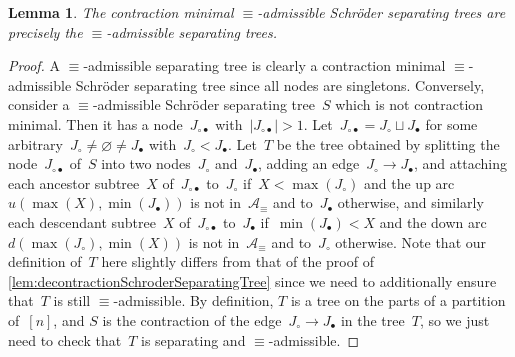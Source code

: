 \documentclass{amsart}
\newtheorem{lemma}[theorem]{Lemma}
\theoremstyle{definition}
\newcommand{\arcs}{{\mathcal{A}}} %
\begin{document}
\begin{lemma}
\label{lem:decontractionAdmissibleSchroderSeparatingTree}
The contraction minimal $\equiv$-admissible Schröder separating trees are precisely the $\equiv$-admissible separating trees.
\end{lemma}

\begin{proof}
A $\equiv$-admissible separating tree is clearly a contraction minimal $\equiv$-admissible Schröder separating tree since all nodes are singletons.
Conversely, consider a $\equiv$-admissible Schröder separating tree~$S$ which is not contraction minimal.
Then it has a node~$J_{\circ\bullet}$ with~$|J_{\circ\bullet}| > 1$.
Let~$J_{\circ\bullet} = J_\circ \sqcup J_\bullet$ for some arbitrary~${J_\circ \ne \varnothing \ne J_\bullet}$ with~$J_\circ < J_\bullet$.
Let~$T$ be the tree obtained by splitting the node~$J_{\circ\bullet}$ of~$S$ into two nodes~$J_\circ$ and~$J_\bullet$, adding an edge~$J_\circ \to J_\bullet$, and attaching 
each ancestor subtree~$X$ of~$J_{\circ\bullet}$ to~$J_\circ$ if~$X < \max(J_\circ)$ and the up arc~$u(\max(X), \min(J_\bullet))$ is not in~$\arcs_\equiv$ and to~$J_\bullet$ otherwise, and similarly each descendant subtree~$X$ of~$J_{\circ\bullet}$ to~$J_\bullet$ if~$\min(J_\bullet) < X$ and the down arc~$d(\max(J_\circ), \min(X))$ is not in~$\arcs_\equiv$ and to~$J_\circ$ otherwise.
Note that our definition of~$T$ here slightly differs from that of the proof of \cref{lem:decontractionSchroderSeparatingTree} since we need to additionally ensure that~$T$ is still $\equiv$-admissible.
By definition, $T$ is a tree on the parts of a partition of~$[n]$, and $S$ is the contraction of the edge~$J_\circ \to J_\bullet$ in the tree~$T$, so we just need to check that~$T$ is separating and $\equiv$-admissible.


\end{proof}
\end{document}
